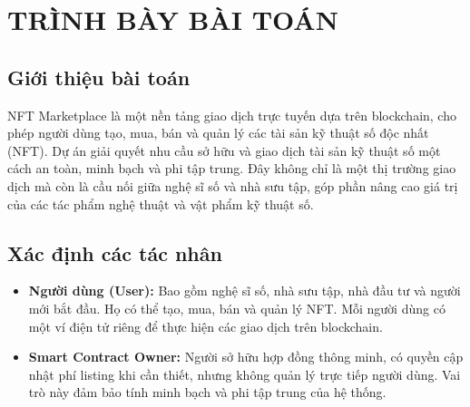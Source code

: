 \chapter{TRÌNH BÀY BÀI TOÁN}

\section{Giới thiệu bài toán}
NFT Marketplace là một nền tảng giao dịch trực tuyến dựa trên blockchain, cho phép người dùng tạo, mua, bán và quản lý các tài sản kỹ thuật số độc nhất (NFT). Dự án giải quyết nhu cầu sở hữu và giao dịch tài sản kỹ thuật số một cách an toàn, minh bạch và phi tập trung. Đây không chỉ là một thị trường giao dịch mà còn là cầu nối giữa nghệ sĩ số và nhà sưu tập, góp phần nâng cao giá trị của các tác phẩm nghệ thuật và vật phẩm kỹ thuật số.

\section{Xác định các tác nhân}
\begin{itemize}
    \item \textbf{Người dùng (User):} Bao gồm nghệ sĩ số, nhà sưu tập, nhà đầu tư và người mới bắt đầu. Họ có thể tạo, mua, bán và quản lý NFT. Mỗi người dùng có một ví điện tử riêng để thực hiện các giao dịch trên blockchain.
    \item \textbf{Smart Contract Owner:} Người sở hữu hợp đồng thông minh, có quyền cập nhật phí listing khi cần thiết, nhưng không quản lý trực tiếp người dùng. Vai trò này đảm bảo tính minh bạch và phi tập trung của hệ thống.
\end{itemize}

